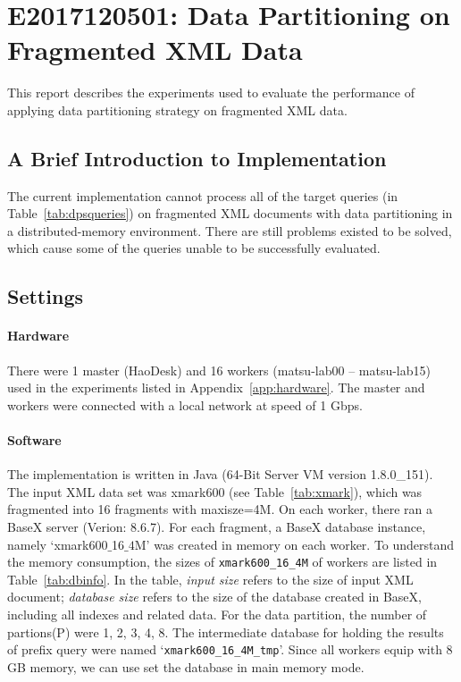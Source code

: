 

\section{E2017120501: Data Partitioning on Fragmented XML Data}

This report describes the experiments used to evaluate the performance
of applying data partitioning strategy on fragmented XML data.

\subsection{A Brief Introduction to Implementation}

The current implementation cannot process all of the target queries 
(in Table~\ref{tab:dpsqueries}) on fragmented XML documents 
with data partitioning in a distributed-memory environment.
There are still problems existed to be solved, which cause some 
of the queries unable to be successfully evaluated.

\subsection{Settings}


\paragraph{Hardware}

There were 1 master (HaoDesk) and 16 workers (matsu-lab00 -- matsu-lab15)
used in the experiments listed in Appendix~\ref{app:hardware}. 
The master and workers were connected with a local network at speed of 1 Gbps.

\paragraph{Software}

The implementation is written in Java (64-Bit Server VM version 1.8.0\_151).
The input XML data set was xmark600 (see Table~\ref{tab:xmark}), which was
fragmented into 16 fragments with maxisze=4M.
On each worker, there ran a BaseX server (Verion: 8.6.7).
For each fragment, a BaseX database instance, namely `xmark600$\_$16$\_4$M' 
was created in memory on each worker. To understand the memory
consumption, the sizes of \texttt{xmark600\_16\_4M} of workers
are listed in Table~\ref{tab:dbinfo}. In the table, \emph{input size} refers 
to the size of input XML document; \emph{database size} refers to the size
of the database created in BaseX, including all indexes and related data.
For the data partition, the number of partions(P) were  1, 2, 3, 4, 8.
The intermediate database for holding the results of prefix
query were named  `\texttt{xmark600\_16\_4M\_tmp}'. 
Since all workers equip with
8 GB memory, we can use set the database in main memory mode.


